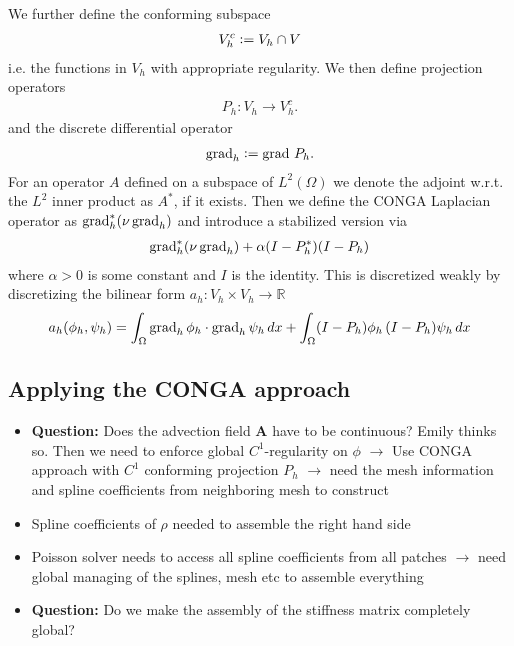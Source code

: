 \documentclass[presentation.tex]{subfiles}
\begin{document}
We further define the conforming subspace
\begin{align*}
    V_h^c \vcentcolon= V_h \cap V
\end{align*}
i.e. the functions in $V_h$ with appropriate regularity. We then define
projection operators
\begin{align*}
    P_h: V_h \rightarrow V_h^c.
\end{align*}
and the discrete differential operator
\begin{align*}
    \operatorname{grad}_h \vcentcolon= \operatorname{grad} \, P_h.
\end{align*}
For an operator $A$ defined on a subspace of $L^2(\Omega)$ we denote the 
adjoint w.r.t. the $L^2$ inner product as $A^*$, if it exists.
Then we define the CONGA Laplacian operator as $\operatorname{grad}_h^* (\nu \operatorname{grad}_h)$
and introduce a stabilized version via
\begin{align*}
    \operatorname{grad}_h^*(\nu \operatorname{grad}_h) + \alpha (I-P_h^*)(I-P_h)
\end{align*}
where $\alpha > 0$ is some constant and $I$ is the identity. This is discretized weakly by discretizing the bilinear
form $a_h: V_h \times V_h \rightarrow \mathbb{R}$
\begin{align*}
    a_h(\phi_h, \psi_h) = \int_\Omega \operatorname{grad}_h \phi_h \cdot \operatorname{grad}_h \psi_h \, dx 
                        + \int_\Omega (I-P_h)\phi_h \, (I-P_h)\psi_h \, dx
\end{align*}

\subsection*{Applying the CONGA approach}
\begin{itemize}
    \item \textbf{Question:} Does the advection field $\mathbf{A}$ have to be
            continuous? Emily thinks so. Then we need to enforce global $C^1$-regularity on $\phi$ 
    $\rightarrow$ Use CONGA approach with $C^1$ conforming projection $P_h$ $\rightarrow$ 
            need the mesh information and spline coefficients from neighboring mesh
            to construct
    \item Spline coefficients of $\rho$ needed to assemble the right hand side
    \item Poisson solver needs to access all spline coefficients from all patches
            $\rightarrow$ need global managing of the splines, mesh etc 
            to assemble everything
    \item \textbf{Question:} Do we make the assembly of the stiffness matrix completely global?
\end{itemize}
\end{document}
